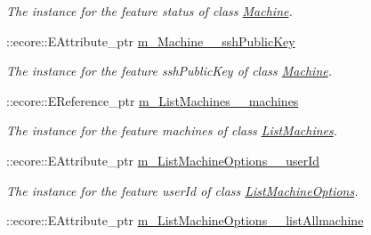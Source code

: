\begin{DoxyCompactItemize}
\begin{DoxyCompactList}\small\item\em The instance for the feature status of class \hyperlink{classUMS__Data_1_1Machine}{Machine}. \item\end{DoxyCompactList}\item 
\hypertarget{classUMS__Data_1_1UMS__DataPackage_abe3b8ff0c0d2885887b8685494e384fc}{
::ecore::EAttribute\_\-ptr \hyperlink{classUMS__Data_1_1UMS__DataPackage_abe3b8ff0c0d2885887b8685494e384fc}{m\_\-Machine\_\-\_\-sshPublicKey}}
\label{classUMS__Data_1_1UMS__DataPackage_abe3b8ff0c0d2885887b8685494e384fc}

\begin{DoxyCompactList}\small\item\em The instance for the feature sshPublicKey of class \hyperlink{classUMS__Data_1_1Machine}{Machine}. \item\end{DoxyCompactList}\item 
\hypertarget{classUMS__Data_1_1UMS__DataPackage_aa1fb47b09d44a58f0c35b6a7048c3e05}{
::ecore::EReference\_\-ptr \hyperlink{classUMS__Data_1_1UMS__DataPackage_aa1fb47b09d44a58f0c35b6a7048c3e05}{m\_\-ListMachines\_\-\_\-machines}}
\label{classUMS__Data_1_1UMS__DataPackage_aa1fb47b09d44a58f0c35b6a7048c3e05}

\begin{DoxyCompactList}\small\item\em The instance for the feature machines of class \hyperlink{classUMS__Data_1_1ListMachines}{ListMachines}. \item\end{DoxyCompactList}\item 
\hypertarget{classUMS__Data_1_1UMS__DataPackage_ac25fb9f7bcd1d51b2f063a5f7bd5a6ea}{
::ecore::EAttribute\_\-ptr \hyperlink{classUMS__Data_1_1UMS__DataPackage_ac25fb9f7bcd1d51b2f063a5f7bd5a6ea}{m\_\-ListMachineOptions\_\-\_\-userId}}
\label{classUMS__Data_1_1UMS__DataPackage_ac25fb9f7bcd1d51b2f063a5f7bd5a6ea}

\begin{DoxyCompactList}\small\item\em The instance for the feature userId of class \hyperlink{classUMS__Data_1_1ListMachineOptions}{ListMachineOptions}. \item\end{DoxyCompactList}\item 
\hypertarget{classUMS__Data_1_1UMS__DataPackage_a628a43cffafe1fb7dad71e5902e26b35}{
::ecore::EAttribute\_\-ptr \hyperlink{classUMS__Data_1_1UMS__DataPackage_a628a43cffafe1fb7dad71e5902e26b35}{m\_\-ListMachineOptions\_\-\_\-listAllmachine}}
\label{classUMS__Data_1_1UMS__DataPackage_a628a43cffafe1fb7dad71e5902e26b35}


\end{DoxyCompactItemize}
